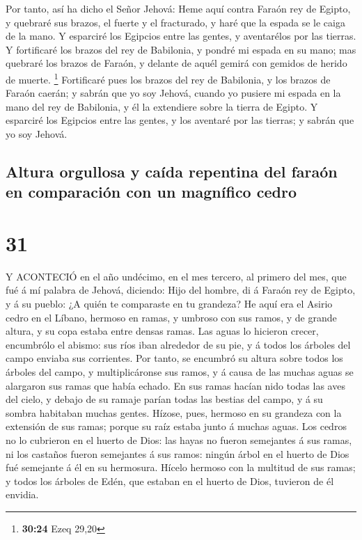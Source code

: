  Por tanto, así ha dicho el Señor Jehová: Heme aquí contra
Faraón rey de Egipto, y quebraré sus brazos, el fuerte y el fracturado,
y haré que la espada se le caiga de la mano.  Y esparciré
los Egipcios entre las gentes, y aventarélos por las tierras.
 Y fortificaré los brazos del rey de Babilonia, y pondré mi
espada en su mano; mas quebraré los brazos de Faraón, y delante de aquél
gemirá con gemidos de herido de muerte. \footnote{\textbf{30:24} Ezeq
  29,20}  Fortificaré pues los brazos del rey de Babilonia,
y los brazos de Faraón caerán; y sabrán que yo soy Jehová, cuando yo
pusiere mi espada en la mano del rey de Babilonia, y él la extendiere
sobre la tierra de Egipto.  Y esparciré los Egipcios entre
las gentes, y los aventaré por las tierras; y sabrán que yo soy Jehová.

\hypertarget{altura-orgullosa-y-cauxedda-repentina-del-farauxf3n-en-comparaciuxf3n-con-un-magnuxedfico-cedro}{%
\subsection{Altura orgullosa y caída repentina del faraón en comparación
con un magnífico
cedro}\label{altura-orgullosa-y-cauxedda-repentina-del-farauxf3n-en-comparaciuxf3n-con-un-magnuxedfico-cedro}}

\hypertarget{section-30}{%
\section{31}\label{section-30}}

 Y ACONTECIÓ en el año undécimo, en el mes tercero, al
primero del mes, que fué á mí palabra de Jehová, diciendo: 
Hijo del hombre, di á Faraón rey de Egipto, y á su pueblo: ¿A quién te
comparaste en tu grandeza?  He aquí era el Asirio cedro en
el Líbano, hermoso en ramas, y umbroso con sus ramos, y de grande
altura, y su copa estaba entre densas ramas.  Las aguas lo
hicieron crecer, encumbrólo el abismo: sus ríos iban alrededor de su
pie, y á todos los árboles del campo enviaba sus corrientes.
 Por tanto, se encumbró su altura sobre todos los árboles
del campo, y multiplicáronse sus ramos, y á causa de las muchas aguas se
alargaron sus ramas que había echado.  En sus ramas hacían
nido todas las aves del cielo, y debajo de su ramaje parían todas las
bestias del campo, y á su sombra habitaban muchas gentes. 
Hízose, pues, hermoso en su grandeza con la extensión de sus ramas;
porque su raíz estaba junto á muchas aguas.  Los cedros no
lo cubrieron en el huerto de Dios: las hayas no fueron semejantes á sus
ramas, ni los castaños fueron semejantes á sus ramos: ningún árbol en el
huerto de Dios fué semejante á él en su hermosura.  Hícelo
hermoso con la multitud de sus ramas; y todos los árboles de Edén, que
estaban en el huerto de Dios, tuvieron de él envidia.

